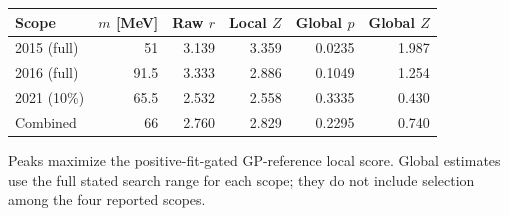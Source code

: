 \begin{center}\small\begin{tabular}{lrrrrr}\toprule
Scope & $m$ [MeV] & Raw $r$ & Local $Z$ & Global $p$ & Global $Z$\\\midrule
2015 (full) & 51 & 3.139 & 3.359 & 0.0235 & 1.987\\
2016 (full) & 91.5 & 3.333 & 2.886 & 0.1049 & 1.254\\
2021 (10\%) & 65.5 & 2.532 & 2.558 & 0.3335 & 0.430\\
Combined & 66 & 2.760 & 2.829 & 0.2295 & 0.740\\
\bottomrule\end{tabular}\end{center}
Peaks maximize the positive-fit-gated GP-reference local score. Global estimates use the full stated search range for each scope; they do not include selection among the four reported scopes.
